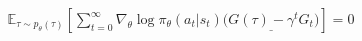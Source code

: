 \begin{align}
\mathbb{E}_{\tau \sim p_\theta(\tau)} \left\lbrack \sum_{t=0}^{\infty} \nabla_\theta \log \pi_\theta(a_t | s_t) \Big( \underline{G(\tau) - \gamma^t G_t} \Big) \right\rbrack = 0
\end{align}